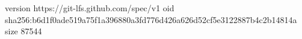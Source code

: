 version https://git-lfs.github.com/spec/v1
oid sha256:b6d1f0ade519a75f1a396880a3fd776d426a626d52cf5e3122887b4c2b14814a
size 87544
